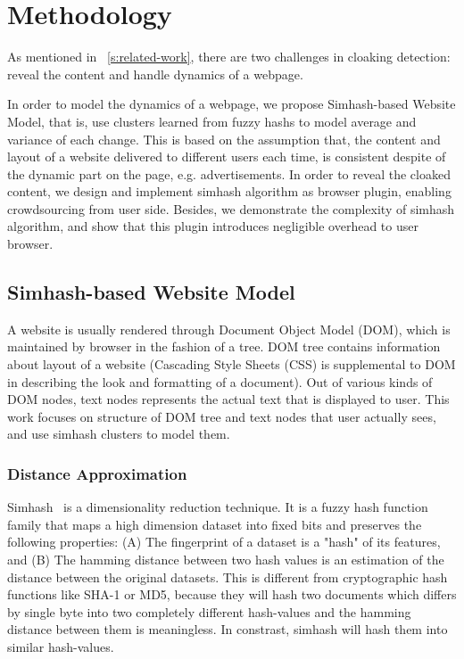 \section{Methodology}
\label{s:methodology}
As mentioned in ~\autoref{s:related-work}, there are two challenges in cloaking
detection: reveal the content and handle dynamics of a webpage.

In order to model the dynamics of a webpage, we propose Simhash-based Website
Model, that is, use clusters learned from fuzzy hashs to model average and
variance of each change. This is based on the assumption that, the content and
layout of a website delivered to different users each time, is consistent
despite of the dynamic part on the page, e.g. advertisements. In order to reveal
the cloaked content, we design and implement simhash algorithm as browser
plugin, enabling crowdsourcing from user side.
Besides, we demonstrate the complexity of simhash algorithm, and show
that this plugin introduces negligible overhead to user browser.

\subsection{Simhash-based Website Model}
A website is usually rendered through Document
Object Model (DOM), which is maintained by browser in the fashion of a tree.
DOM tree contains information about layout of a website (Cascading Style
Sheets (CSS) is supplemental to DOM in describing the look and
formatting of a document). Out of various kinds of DOM nodes,  text nodes
represents the actual text that is displayed to user. This work focuses on
structure of DOM tree and text nodes that user actually sees, and use simhash
clusters to model them.


\subsubsection{Distance Approximation}
Simhash~\cite{charikar2002similarity} is a dimensionality reduction technique.
It is a fuzzy hash function family that maps a high dimension dataset into fixed
bits and preserves the following properties: 
(A) The fingerprint of a dataset is a "hash" of its features, and (B) The
hamming distance between two hash values is an estimation of the distance
between the original datasets.
This is different from 
cryptographic hash functions like SHA-1 or MD5, because they will hash two
documents which differs by single byte into two completely different hash-values and the
hamming distance between them is meaningless. 
In constrast, simhash will hash them into similar hash-values.

